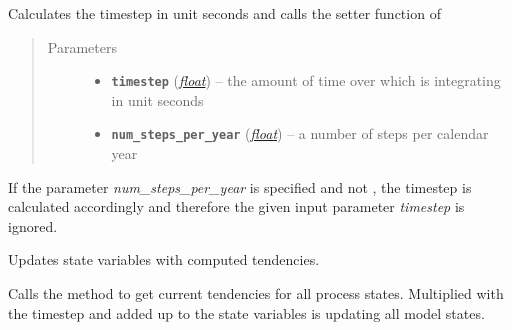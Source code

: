 \documentclass[letterpaper,10pt,english]{sphinxmanual}
\begin{document}
\begin{fulllineitems}
\begin{fulllineitems}
\label{api/climlab.process:climlab.process.time_dependent_process.TimeDependentProcess.set_timestep}
Calculates the timestep in unit seconds
and calls the setter function of {\hyperref[api/climlab.process:climlab.process.time_dependent_process.TimeDependentProcess.timestep]{\emph{}}}
\begin{quote}\begin{description}
\item[{Parameters}] \leavevmode\begin{itemize}
\item {} 
\textbf{\texttt{timestep}} (\href{http://docs.python.org/2.7/library/functions.html\#float}{\emph{float}}) -- the amount of time over which 
{\hyperref[api/climlab.process:climlab.process.time_dependent_process.TimeDependentProcess.step_forward]{\emph{}}} is integrating 
in unit seconds

\item {} 
\textbf{\texttt{num\_steps\_per\_year}} (\href{http://docs.python.org/2.7/library/functions.html\#float}{\emph{float}}) -- a number of steps per calendar year

\end{itemize}

\end{description}\end{quote}

If the parameter \emph{num\_steps\_per\_year} is specified and not , 
the timestep is calculated accordingly and therefore the given input
parameter \emph{timestep} is ignored.

\end{fulllineitems}


\begin{fulllineitems}
\label{api/climlab.process:climlab.process.time_dependent_process.TimeDependentProcess.step_forward}
Updates state variables with computed tendencies.

Calls the {\hyperref[api/climlab.process:climlab.process.time_dependent_process.TimeDependentProcess.compute]{\emph{}}} method to get current tendencies for all
process states. Multiplied with the timestep and added up to the state
variables is updating all model states.


\end{fulllineitems}
\end{fulllineitems}
\end{document}
